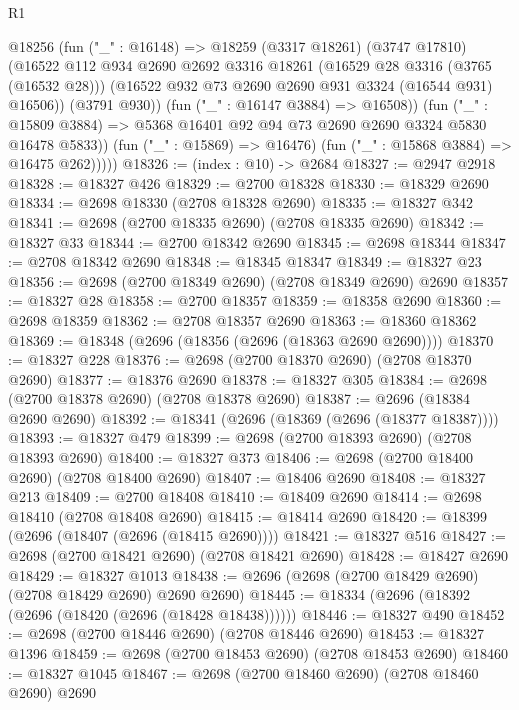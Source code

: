 \begin{lexlean}{R1}
\begin{coremodule}
              @18256
                (fun ("_" : @16148) =>
                @18259
                  (@3317 @18261)
                  (@3747 @17810)
                  (@16522
                    @112
                    @934
                    @2690
                    @2692
                    @3316
                    @18261
                    (@16529 @28 @3316 (@3765 (@16532 @28)))
                    (@16522 @932 @73 @2690 @2690 @931 @3324 (@16544 @931) @16506))
                  (@3791 @930))
                (fun ("_" : @16147 @3884) => @16508))
              (fun ("_" : @15809 @3884) =>
              @5368 @16401 @92 @94 @73 @2690 @2690 @3324 @5830 @16478 @5833))
            (fun ("_" : @15869) => @16476)
            (fun ("_" : @15868 @3884) => @16475 @262)))))
@18326 := (index : @10) -> @2684
@18327 := @2947 @2918
@18328 := @18327 @426
@18329 := @2700 @18328
@18330 := @18329 @2690
@18334 := @2698 @18330 (@2708 @18328 @2690)
@18335 := @18327 @342
@18341 := @2698 (@2700 @18335 @2690) (@2708 @18335 @2690)
@18342 := @18327 @33
@18344 := @2700 @18342 @2690
@18345 := @2698 @18344
@18347 := @2708 @18342 @2690
@18348 := @18345 @18347
@18349 := @18327 @23
@18356 := @2698 (@2700 @18349 @2690) (@2708 @18349 @2690) @2690
@18357 := @18327 @28
@18358 := @2700 @18357
@18359 := @18358 @2690
@18360 := @2698 @18359
@18362 := @2708 @18357 @2690
@18363 := @18360 @18362
@18369 := @18348 (@2696 (@18356 (@2696 (@18363 @2690 @2690))))
@18370 := @18327 @228
@18376 := @2698 (@2700 @18370 @2690) (@2708 @18370 @2690)
@18377 := @18376 @2690
@18378 := @18327 @305
@18384 := @2698 (@2700 @18378 @2690) (@2708 @18378 @2690)
@18387 := @2696 (@18384 @2690 @2690)
@18392 := @18341 (@2696 (@18369 (@2696 (@18377 @18387))))
@18393 := @18327 @479
@18399 := @2698 (@2700 @18393 @2690) (@2708 @18393 @2690)
@18400 := @18327 @373
@18406 := @2698 (@2700 @18400 @2690) (@2708 @18400 @2690)
@18407 := @18406 @2690
@18408 := @18327 @213
@18409 := @2700 @18408
@18410 := @18409 @2690
@18414 := @2698 @18410 (@2708 @18408 @2690)
@18415 := @18414 @2690
@18420 := @18399 (@2696 (@18407 (@2696 (@18415 @2690))))
@18421 := @18327 @516
@18427 := @2698 (@2700 @18421 @2690) (@2708 @18421 @2690)
@18428 := @18427 @2690
@18429 := @18327 @1013
@18438 := @2696 (@2698 (@2700 @18429 @2690) (@2708 @18429 @2690) @2690 @2690)
@18445 := @18334 (@2696 (@18392 (@2696 (@18420 (@2696 (@18428 @18438))))))
@18446 := @18327 @490
@18452 := @2698 (@2700 @18446 @2690) (@2708 @18446 @2690)
@18453 := @18327 @1396
@18459 := @2698 (@2700 @18453 @2690) (@2708 @18453 @2690)
@18460 := @18327 @1045
@18467 := @2698 (@2700 @18460 @2690) (@2708 @18460 @2690) @2690

\end{coremodule}
\end{lexlean}
